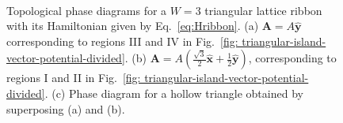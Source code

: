\documentclass[aps,prb,showpacs,amsmath,twocolumn,amssymb,superscriptaddress]{revtex4-2}
\let\oldhat\hat
\renewcommand{\hat}[1]{\oldhat{\mathbf{#1}}}
\begin{document}
\begin{figure}[ht]
  \\
  \caption{Topological phase diagrams for a $W=3$ triangular lattice ribbon with its Hamiltonian given by Eq.~\eqref{eq:Hribbon}. (a) $\bm A = A\hat{y}$ corresponding to regions III and IV in Fig.~\ref{fig: triangular-island-vector-potential-divided}. (b) $\bm A = A(\frac{\sqrt{3}}{2}\hat{x}+\frac{1}{2}\hat{y})$, corresponding to regions I and II in Fig.~\ref{fig: triangular-island-vector-potential-divided}. (c) Phase diagram for a hollow triangle obtained by superposing (a) and (b).}
  \label{fig: majorana-number}
\end{figure}
\end{document}
